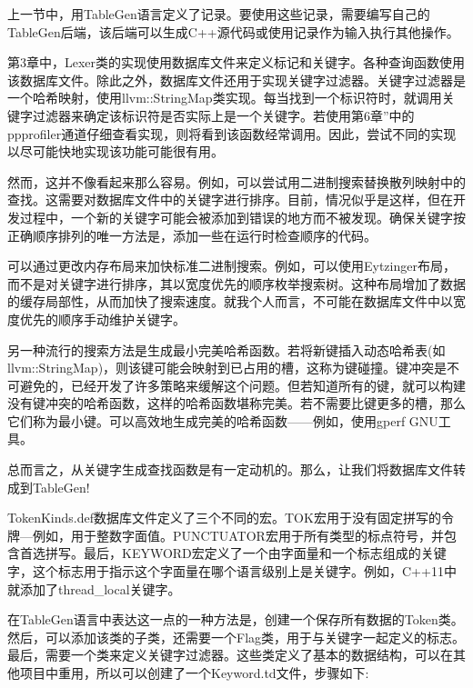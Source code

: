 
上一节中，用TableGen语言定义了记录。要使用这些记录，需要编写自己的TableGen后端，该后端可以生成C++源代码或使用记录作为输入执行其他操作。

第3章中，Lexer类的实现使用数据库文件来定义标记和关键字。各种查询函数使用该数据库文件。除此之外，数据库文件还用于实现关键字过滤器。关键字过滤器是一个哈希映射，使用llvm::StringMap类实现。每当找到一个标识符时，就调用关键字过滤器来确定该标识符是否实际上是一个关键字。若使用第6章”中的ppprofiler通道仔细查看实现，则将看到该函数经常调用。因此，尝试不同的实现以尽可能快地实现该功能可能很有用。

然而，这并不像看起来那么容易。例如，可以尝试用二进制搜索替换散列映射中的查找。这需要对数据库文件中的关键字进行排序。目前，情况似乎是这样，但在开发过程中，一个新的关键字可能会被添加到错误的地方而不被发现。确保关键字按正确顺序排列的唯一方法是，添加一些在运行时检查顺序的代码。

可以通过更改内存布局来加快标准二进制搜索。例如，可以使用Eytzinger布局，而不是对关键字进行排序，其以宽度优先的顺序枚举搜索树。这种布局增加了数据的缓存局部性，从而加快了搜索速度。就我个人而言，不可能在数据库文件中以宽度优先的顺序手动维护关键字。

另一种流行的搜索方法是生成最小完美哈希函数。若将新键插入动态哈希表(如llvm::StringMap)，则该键可能会映射到已占用的槽，这称为键碰撞。键冲突是不可避免的，已经开发了许多策略来缓解这个问题。但若知道所有的键，就可以构建没有键冲突的哈希函数，这样的哈希函数堪称完美。若不需要比键更多的槽，那么它们称为最小键。可以高效地生成完美的哈希函数——例如，使用gperf GNU工具。

总而言之，从关键字生成查找函数是有一定动机的。那么，让我们将数据库文件转成到TableGen!


TokenKinds.def数据库文件定义了三个不同的宏。TOK宏用于没有固定拼写的令牌—例如，用于整数字面值。PUNCTUATOR宏用于所有类型的标点符号，并包含首选拼写。最后，KEYWORD宏定义了一个由字面量和一个标志组成的关键字，这个标志用于指示这个字面量在哪个语言级别上是关键字。例如，C++11中就添加了thread\_local关键字。

在TableGen语言中表达这一点的一种方法是，创建一个保存所有数据的Token类。然后，可以添加该类的子类，还需要一个Flag类，用于与关键字一起定义的标志。最后，需要一个类来定义关键字过滤器。这些类定义了基本的数据结构，可以在其他项目中重用，所以可以创建了一个Keyword.td文件，步骤如下:


